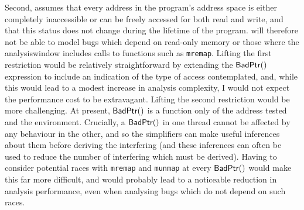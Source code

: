 Second, {\implementation} assumes that every address in the program's
address space is either completely inaccessible or can be freely
accessed for both read and write, and that this status does not change
during the lifetime of the program.  {\Implementation} will therefore
not be able to model bugs which depend on read-only memory or those
where the \gls{analysiswindow} includes calls to functions such as
\texttt{mremap}.  Lifting the first restriction would be relatively
straightforward by extending the $\mathsf{BadPtr}()$ expression to include
an indication of the type of access contemplated, and, while this
would lead to a modest increase in analysis complexity, I would not
expect the performance cost to be extravagant.  Lifting the second
restriction would be more challenging.  At present, $\mathsf{BadPtr}()$ is a
function only of the address tested and the {\StateMachine}
environment.  Crucially, a $\mathsf{BadPtr}()$ in one thread cannot be
affected by any behaviour in the other, and so the {\StateMachine}
simplifiers can make useful inferences about them before deriving the
interfering {\StateMachine} (and these inferences can often be used to
reduce the number of interfering {\StateMachines} which must be
derived).  Having to consider potential races with \texttt{mremap} and
\texttt{munmap} at every $\mathsf{BadPtr}()$ would make this far more
difficult, and would probably lead to a noticeable reduction in
analysis performance, even when analysing bugs which do not depend on
such races.

